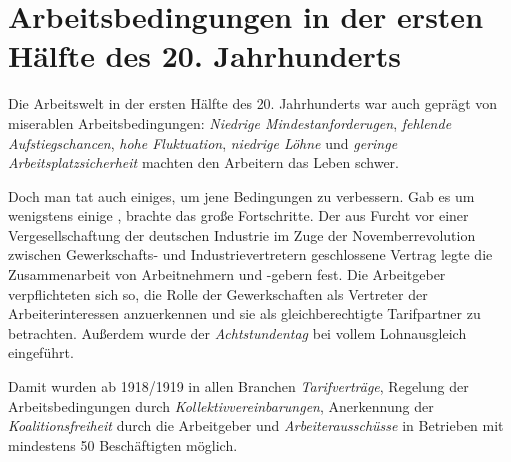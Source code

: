 \section{Arbeitsbedingungen in der ersten Hälfte des 20. Jahrhunderts}
\label{sec:arb-bed-20jh}

Die Arbeitswelt in der ersten Hälfte des 20. Jahrhunderts war auch
geprägt von miserablen Arbeitsbedingungen: \emph{Niedrige
Mindestanforderugen}, \emph{fehlende Aufstiegschancen}, 
\emph{hohe Fluktuation}, \emph{niedrige Löhne} und \emph{geringe
Arbeitsplatzsicherheit} machten den Arbeitern das Leben schwer.

Doch man tat auch einiges, um jene Bedingungen zu verbessern.  Gab es
um  wenigstens einige ,
brachte das  große Fortschritte. Der
aus Furcht vor einer Vergesellschaftung der deutschen Industrie im Zuge
der Novemberrevolution zwischen Gewerkschafts-  und
Industrievertretern  geschlossene Vertrag legte die
Zusammenarbeit von Arbeitnehmern und -gebern fest. Die Arbeitgeber
verpflichteten sich so, die Rolle der Gewerkschaften als Vertreter der
Arbeiterinteressen anzuerkennen und sie als gleichberechtigte
Tarifpartner zu betrachten. Außerdem wurde der \emph{Achtstundentag}
bei vollem Lohnausgleich eingeführt.

Damit wurden ab 1918/1919 in allen Branchen \emph{Tarifverträge},
Regelung der Arbeitsbedingungen durch \emph{Kollektivvereinbarungen},
Anerkennung der \emph{Koalitionsfreiheit} durch die Arbeitgeber und
\emph{Arbeiterausschüsse} in Betrieben mit mindestens 50 Beschäftigten
möglich.

\endinput

